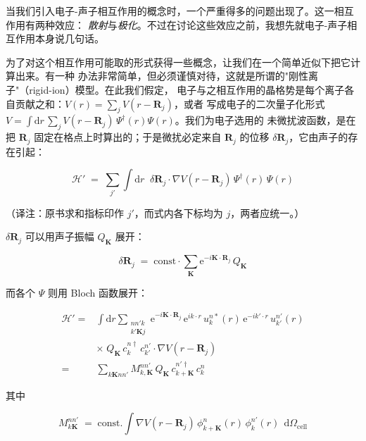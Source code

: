 当我们引入电子-声子相互作用的概念时，一个严重得多的问题出现了。这一相互作用有两种效应：
\emph{散射}与\emph{极化}。不过在讨论这些效应之前，我想先就电子-声子相互作用本身说几句话。

为了对这个相互作用可能取的形式获得一些概念，让我们在一个简单近似下把它计算出来。有一种
办法非常简单，但必须谨慎对待，这就是所谓的"刚性离子"（rigid-ion）模型。在此我们假定，
电子与之相互作用的晶格势是每个离子各自贡献之和：$V(r)=\sum_{j}V(r-\mathbf{R}_{j})$，或者
写成电子的二次量子化形式
$V=\int\mathrm{d}r\,\sum_{j}V(r-\mathbf{R}_{j})\,\Psi^{\dagger}(r)\Psi(r)$。我们为电子选用的
未微扰波函数，是在把 $\mathbf{R}_{j}$ 固定在格点上时算出的；于是微扰必定来自 $\mathbf{R}_{j}$
的位移 $\delta\mathbf{R}_{j}$，它由声子的存在引起：

\begin{equation*}
\mathcal{H}' \;=\; \sum_{j'} \int \mathrm{d}r\;\; \delta\mathbf{R}_{j} \cdot \nabla V(r-\mathbf{R}_{j})\, \Psi^{\dagger}(r)\, \Psi(r)
\end{equation*}

（译注：原书求和指标印作 $j'$，而式内各下标均为 $j$，两者应统一。）

$\delta\mathbf{R}_{j}$ 可以用声子振幅 $Q_{\mathbf{K}}$ 展开：

\begin{equation*}
\delta\mathbf{R}_{j} \;=\; \text{const} \cdot \sum_{\mathbf{K}} \mathrm{e}^{-i\mathbf{K}\cdot\mathbf{R}_{j}}\, Q_{\mathbf{K}}
\end{equation*}

而各个 $\Psi$ 则用 Bloch 函数展开：

\begin{align*}
\mathcal{H}' = {} & \int \mathrm{d}r \sum_{\substack{nn'k \\ k'\mathbf{K}j}}
\mathrm{e}^{-i\mathbf{K}\cdot\mathbf{R}_{j}}\,
\mathrm{e}^{ik\cdot r}\, u^{n*}_{k}(r)\,
\mathrm{e}^{-ik'\cdot r}\, u^{n'}_{k'}(r) \\
& \times\; Q_{\mathbf{K}}\, c^{n\dagger}_{k}\, c^{n'}_{k'} \cdot \nabla V(r-\mathbf{R}_{j}) \\
= {} & \sum_{k\mathbf{K}nn'} M^{nn'}_{k,\mathbf{K}}\, Q_{\mathbf{K}}\, c^{n'\dagger}_{k+\mathbf{K}}\, c^{n}_{k}
\end{align*}

其中

\begin{equation*}
M^{nn'}_{k\mathbf{K}} \;=\; \text{const.} \int \nabla V(r-\mathbf{R}_{j})\, \phi^{n}_{k+\mathbf{K}}(r)\, \phi^{n'}_{k}(r)\;\, \mathrm{d}\Omega_{\mathrm{cell}}
\tag{7}
\end{equation*}

